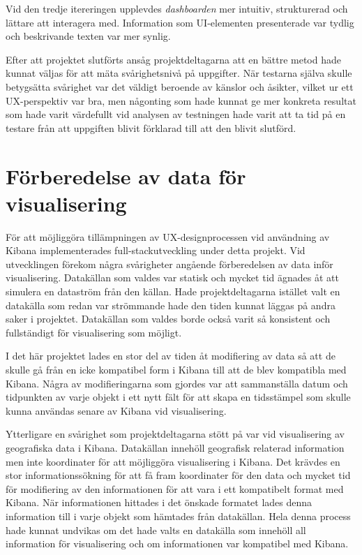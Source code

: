 \documentclass[12pt]{kththesis}
\begin{document}
Vid den tredje itereringen upplevdes \textit{dashboarden} mer intuitiv, strukturerad och lättare att interagera med. Information som UI-elementen presenterade var tydlig och beskrivande texten var mer synlig. 

Efter att projektet slutförts ansåg projektdeltagarna att en bättre metod hade kunnat väljas för att mäta svårighetsnivå på uppgifter. När testarna själva skulle betygsätta svårighet var det väldigt beroende av känslor och åsikter, vilket ur ett UX-perspektiv var bra, men någonting som hade kunnat ge mer konkreta resultat som hade varit värdefullt vid analysen av testningen hade varit att ta tid på en testare från att uppgiften blivit förklarad till att den blivit slutförd. 

\section{Förberedelse av data för visualisering}
För att möjliggöra tillämpningen av UX-designprocessen vid användning av Kibana implementerades full-stackutveckling under detta projekt. Vid utvecklingen förekom några svårigheter angående förberedelsen av data inför visualisering. Datakällan som valdes var statisk och mycket tid ägnades åt att simulera en dataström från den källan. Hade projektdeltagarna istället valt en datakälla som redan var strömmande hade den tiden kunnat läggas på andra saker i projektet. Datakällan som valdes borde också varit så konsistent och fullständigt för visualisering som möjligt. 

I det här projektet lades en stor del av tiden åt modifiering av data så att de skulle gå från en icke kompatibel form i Kibana till att de blev kompatibla med Kibana. Några av modifieringarna som gjordes var att sammanställa datum och tidpunkten av varje objekt i ett nytt fält för att skapa en tidsstämpel som skulle kunna användas senare av Kibana vid visualisering. 

Ytterligare en svårighet som projektdeltagarna stött på var vid visualisering av geografiska data i Kibana. Datakällan innehöll geografisk relaterad information men inte koordinater för att möjliggöra visualisering i Kibana. Det krävdes en stor informationssökning för att få fram koordinater för den data och mycket tid för modifiering av den informationen för att vara i ett kompatibelt format med Kibana. När informationen hittades i det önskade formatet lades denna information till i varje objekt som hämtades från datakällan. Hela denna process hade kunnat undvikas om det hade valts en datakälla som innehöll all information för visualisering och om informationen var kompatibel med Kibana.
\end{document}
